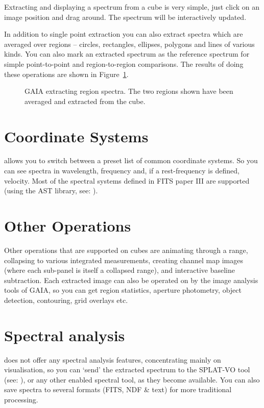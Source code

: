 \documentclass[11pt,twoside]{article}  %
\begin{document}
Extracting and displaying a spectrum from a cube is very simple, just click on
an image position and drag around. The spectrum will be interactively updated.

In addition to single point extraction you can also extract spectra which are
averaged over regions -- circles, rectangles, ellipses, polygons and lines of
various kinds. You can also mark an extracted spectrum as the reference
spectrum for simple point-to-point and region-to-region comparisons.
The results of doing these operations are shown in Figure~\ref{D1.1-fig2}.

\begin{figure}
\caption{GAIA extracting region spectra. The two regions shown have been
averaged and extracted from the cube.}
\label{D1.1-fig2}
\end{figure}


\section{Coordinate Systems}

allows you to switch between a preset list of common coordinate systems. So
you can see spectra in wavelength, frequency and, if a rest-frequency is
defined, velocity. Most of the spectral systems defined in FITS paper III are
supported (using the
AST library, see: ).

\section{Other Operations}

Other operations that are supported on cubes are animating through a range,
collapsing to various integrated measurements, creating channel map images
(where each sub-panel is itself a collapsed range), and interactive baseline
subtraction. Each extracted image can also be operated on by the image
analysis tools of GAIA, so you can get region statistics, aperture photometry,
object detection, contouring, grid overlays etc.

\section{Spectral analysis}

does not offer any spectral analysis features, concentrating mainly on
visualisation, so you can `send' the extracted spectrum to the SPLAT-VO tool
(see: ), or any other
enabled spectral tool, as they become available. You can also save spectra to
several formats (FITS, NDF \& text) for more traditional processing.
\end{document}
